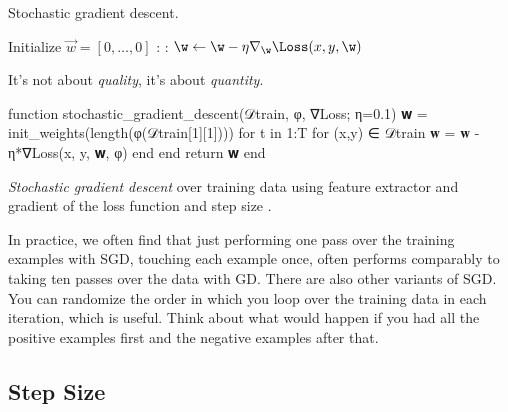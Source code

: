 \begin{algorithm}[ht]
  \caption{Stochastic gradient descent.}
  \begin{algorithmic}
    \State Initialize $\vec{w}=[0,\ldots,0]$
    :
        :
            \State $\w \leftarrow \w - \eta \nabla_{\w} \Loss(x, y, \w)$
        \EndFor
    \EndFor
  \EndFunction
  \end{algorithmic}
   It's not about \textit{quality}, it's about \textit{quantity}.
\end{algorithm}
\begin{algorithm}
\begin{juliaverbatim}
function stochastic_gradient_descent(𝒟train, φ, ∇Loss; η=0.1)
    𝐰 = init_weights(length(φ(𝒟train[1][1])))
    for t in 1:T
        for (x,y) ∈ 𝒟train
            𝐰 = 𝐰 - η*∇Loss(x, y, 𝐰, φ)
        end
    end
    return 𝐰
end
\end{juliaverbatim}

\caption{
    \label{alg:sgd}
    \textit{Stochastic gradient descent} over training data  using feature extractor  and gradient of the loss function  and step size .
}
\end{algorithm}


In practice, we often find that just performing one pass over the training examples with SGD,
touching each example once, often performs comparably to
taking ten passes over the data with GD.
% 
There are also other variants of SGD.
You can randomize the order in which you loop over the training data in each iteration,
which is useful.
Think about what would happen if you had all the positive examples first and the negative examples after that.


\subsection{Step Size} %
\label{sub:step_size}

